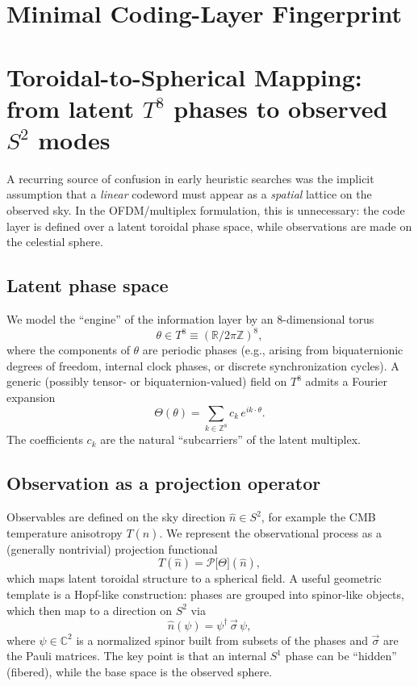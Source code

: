 \documentclass[11pt]{article}
\begin{document}
\section{Minimal Coding-Layer Fingerprint}


\section{Toroidal-to-Spherical Mapping: from latent $T^8$ phases to observed $S^2$ modes}
\label{sec:torus_to_sphere}

A recurring source of confusion in early heuristic searches was the implicit assumption that a \emph{linear}
codeword must appear as a \emph{spatial} lattice on the observed sky. In the OFDM/multiplex formulation, this is
unnecessary: the code layer is defined over a latent toroidal phase space, while observations are made on the
celestial sphere.

\subsection{Latent phase space}
We model the ``engine'' of the information layer by an 8-dimensional torus
\begin{equation}
  \theta \in T^8 \equiv (\mathbb{R}/2\pi\mathbb{Z})^8,
\end{equation}
where the components of $\theta$ are periodic phases (e.g., arising from biquaternionic degrees of freedom, internal
clock phases, or discrete synchronization cycles). A generic (possibly tensor- or biquaternion-valued) field on $T^8$
admits a Fourier expansion
\begin{equation}
  \Theta(\theta) = \sum_{k\in\mathbb{Z}^8} c_k\, e^{i k\cdot \theta}.
\end{equation}
The coefficients $c_k$ are the natural ``subcarriers'' of the latent multiplex.

\subsection{Observation as a projection operator}
Observables are defined on the sky direction $\hat n\in S^2$, for example the CMB temperature anisotropy
$T(\hat n)$. We represent the observational process as a (generally nontrivial) projection functional
\begin{equation}
  T(\hat n) = \mathcal{P}\big[\Theta\big](\hat n),
\end{equation}
which maps latent toroidal structure to a spherical field. A useful geometric template is a Hopf-like construction:
phases are grouped into spinor-like objects, which then map to a direction on $S^2$ via
\begin{equation}
  \hat n(\psi) = \psi^\dagger \,\vec\sigma\, \psi,
\end{equation}
where $\psi\in\mathbb{C}^2$ is a normalized spinor built from subsets of the phases and $\vec\sigma$ are the Pauli matrices.
The key point is that an internal $S^1$ phase can be ``hidden'' (fibered), while the base space is the observed sphere.
\end{document}
